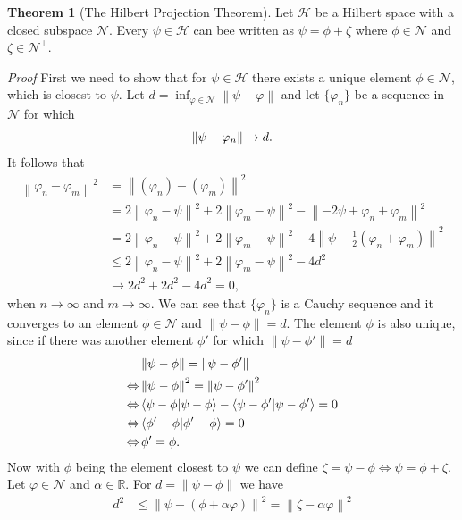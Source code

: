 \documentclass[a4paper,12pt]{wihuri}
\theoremstyle{definition}
\newtheorem{theorem}{Theorem}
\numberwithin{definition}{section}
\numberwithin{example}{section}
\numberwithin{theorem}{section}
\numberwithin{proposition}{section}
\numberwithin{lemma}{section}
\newcommand{\hi}{\mathcal{H}}%
\newcommand{\N}{\mathcal{N}}%
\newcommand{\real}{\mathbb{R}}%
\newcommand{\norm}[1]{\left\lVert#1\right\rVert}
\begin{document}
\begin{theorem}[The Hilbert Projection Theorem]
Let $\hi$ be a Hilbert space with a closed subspace $\N$. Every $\psi \in \hi$ can bee written as $\psi = \phi + \zeta$ where $\phi \in \N$ and $\zeta\in \N^\perp$. 

\noindent \textit{Proof} First we need to show that for $\psi \in \hi$ there exists a unique element $\phi\in\N$, which is closest to $\psi$. Let $d = \inf_{\varphi\in \N}\norm{\psi-\varphi}$ and let $\{\varphi_n\}$ be a sequence in $\N$ for which
\begin{align*}
\norm{\psi -\varphi_n}\rightarrow d\text.
\end{align*}
It follows that
\begin{align*}
\norm{\varphi_n - \varphi_m}^2 &=\norm{(\varphi_n) - (\varphi_m)}^2 \\
&= 2\norm{\varphi_n-\psi}^2 + 2\norm{\varphi_m-\psi}^2 - \norm{-2\psi + \varphi_n + \varphi_m}^2 \\
&= 2\norm{\varphi_n-\psi}^2 + 2\norm{\varphi_m-\psi}^2 - 4\norm{\psi- \frac{1}{2}(\varphi_n+\varphi_m)}^2 \\
&\leq 2\norm{\varphi_n-\psi}^2 + 2\norm{\varphi_m-\psi}^2 - 4d^2 \\
&\rightarrow 2d^2 + 2d^2 - 4d^2 = 0,
\end{align*}
when $n \rightarrow \infty$ and $m \rightarrow \infty$. We can see that $\{\varphi_n\}$ is a Cauchy sequence and it converges to an element $\phi \in \N$ and $\norm{\psi - \phi} = d$. The element $\phi$ is also unique, since if there was another element $\phi'$ for which $\norm{\psi-\phi'} = d$ 
\begin{align*}
&\norm{\psi - \phi} = \norm{\psi - \phi'} \\
\Leftrightarrow &\norm{\psi - \phi}^2 = \norm{\psi - \phi'}^2 \\
\Leftrightarrow &\braket{\psi-\phi | \psi-\phi} - \braket{\psi-\phi' | \psi - \phi'} = 0 \\
\Leftrightarrow &\braket{\phi' - \phi | \phi' - \phi} = 0 \\
\Leftrightarrow &\, \phi' = \phi \text.
\end{align*}
Now with $\phi$ being the element closest to $\psi$ we can define $\zeta = \psi - \phi \Leftrightarrow \psi = \phi + \zeta$. Let $\varphi \in \N$ and $\alpha \in \real$. For $d = \norm{\psi - \phi}$ we have
\begin{align*}
d^2 &\leq \norm{\psi - (\phi + \alpha\varphi)}^2 = \norm{\zeta - \alpha\varphi}^2 \\

\end{align*}
\end{theorem}
\end{document}
